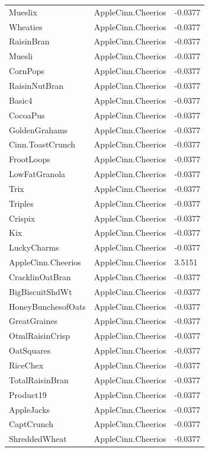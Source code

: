 \begin{table}[!htbp]
\begin{tabular}{lll}
\\
Mueslix & AppleCinn.Cheerios & -0.0377
\\
Wheaties & AppleCinn.Cheerios & -0.0377
\\
RaisinBran & AppleCinn.Cheerios & -0.0377
\\
Muesli & AppleCinn.Cheerios & -0.0377
\\
CornPops & AppleCinn.Cheerios & -0.0377
\\
RaisinNutBran & AppleCinn.Cheerios & -0.0377
\\
Basic4 & AppleCinn.Cheerios & -0.0377
\\
CocoaPus & AppleCinn.Cheerios & -0.0377
\\
GoldenGrahams & AppleCinn.Cheerios & -0.0377
\\
Cinn.ToastCrunch & AppleCinn.Cheerios & -0.0377
\\
FrootLoops & AppleCinn.Cheerios & -0.0377
\\
LowFatGranola & AppleCinn.Cheerios & -0.0377
\\
Trix & AppleCinn.Cheerios & -0.0377
\\
Triples & AppleCinn.Cheerios & -0.0377
\\
Crispix & AppleCinn.Cheerios & -0.0377
\\
Kix & AppleCinn.Cheerios & -0.0377
\\
LuckyCharms & AppleCinn.Cheerios & -0.0377
\\
AppleCinn.Cheerios & AppleCinn.Cheerios & 3.5151
\\
CracklinOatBran & AppleCinn.Cheerios & -0.0377
\\
BigBiscuitShdWt & AppleCinn.Cheerios & -0.0377
\\
HoneyBunchesofOats & AppleCinn.Cheerios & -0.0377
\\
GreatGraines & AppleCinn.Cheerios & -0.0377
\\
OtmlRaisinCrisp & AppleCinn.Cheerios & -0.0377
\\
OatSquares & AppleCinn.Cheerios & -0.0377
\\
RiceChex & AppleCinn.Cheerios & -0.0377
\\
TotalRaisinBran & AppleCinn.Cheerios & -0.0377
\\
Product19 & AppleCinn.Cheerios & -0.0377
\\
AppleJacks & AppleCinn.Cheerios & -0.0377
\\
CaptCrunch & AppleCinn.Cheerios & -0.0377
\\
ShreddedWheat & AppleCinn.Cheerios & -0.0377
\\

\end{tabular}
\end{table}

